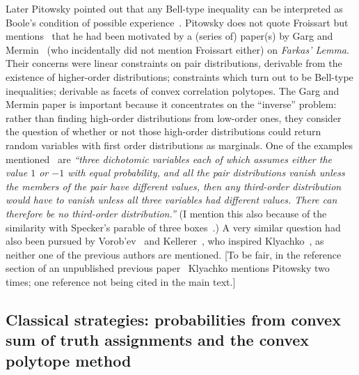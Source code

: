 Later Pitowsky pointed out that any Bell-type inequality can be interpreted as
Boole's condition of possible experience~\cite{pitowsky-86,pitowsky,pitowsky-89a,Pit-91,Pit-94,2000-poly}.
Pitowsky  does not quote Froissart but mentions~\cite[p.~1556]{pitowsky-86} that he
had been motivated by a (series of) paper(s) by Garg and Mermin~\cite{Garg1984}
(who incidentally did not mention Froissart either)
on  {\em Farkas' Lemma}.
Their concerns were linear constraints on pair distributions, derivable from the existence of higher-order distributions;
constraints which turn out to be Bell-type inequalities; derivable as facets of convex correlation polytopes.
The Garg and Mermin paper is important because it concentrates on the ``inverse'' problem:
rather than finding high-order distributions
from low-order ones,  they consider the
question of whether or not those high-order distributions could return random variables with first order distributions as
marginals. One of the examples mentioned~\cite[p.~2]{Garg1984}
are {\em ``three dichotomic
variables each of which assumes either the value $1$ or $-1$ with equal
probability, and all the pair distributions vanish unless the members of the
pair have different values, then any third-order distribution would have to
vanish unless all three variables had different values. There can therefore be
no third-order distribution.''}
(I mention this also because of the similarity with Specker's parable of three boxes~\cite{specker-60,svozil-2016-s}.)
A very similar question had also been pursued by Vorob'ev~\cite{Vorobev-1962} and Kellerer~\cite{Kellerer-1964,Kellerer-1984},
who inspired Klyachko~\cite{Klyachko-2008},
as neither one of the previous authors are mentioned.
[To be fair, in the reference section of an unpublished previous paper~\cite{Klyachko-2002} Klyachko
mentions Pitowsky two times; one reference not being cited in the main text.]


\subsection{Classical strategies: probabilities from convex sum of truth assignments and the convex polytope method}
\label{2017-b-chm}

